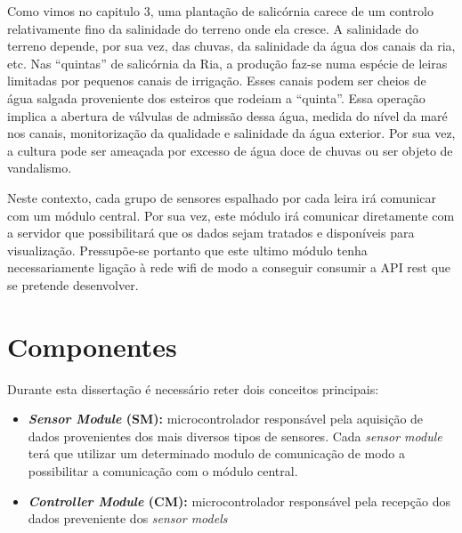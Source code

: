 Como vimos no capitulo 3, uma plantação de  salicórnia carece de um controlo relativamente fino da salinidade do terreno onde ela cresce. A salinidade do terreno depende, por sua vez, das chuvas, da salinidade da água dos canais da ria, etc. Nas “quintas” de salicórnia da Ria, a produção faz-se numa espécie de leiras limitadas por pequenos canais de irrigação. Esses canais podem ser cheios de água salgada proveniente dos esteiros que rodeiam a “quinta”. Essa operação implica a abertura de válvulas de admissão dessa água, medida do nível da maré nos canais, monitorização da qualidade e salinidade da água exterior.
Por sua vez, a cultura pode ser ameaçada por excesso de água doce de chuvas ou ser objeto de vandalismo.





Neste contexto, cada grupo de sensores espalhado por cada leira irá comunicar com um módulo central. Por sua vez, este módulo irá comunicar diretamente com a servidor que possibilitará que os dados sejam tratados e disponíveis para visualização. Pressupõe-se portanto que este ultimo módulo tenha necessariamente ligação à rede wifi de modo a conseguir consumir a API rest que se pretende desenvolver. 


\section{Componentes}

Durante esta dissertação é necessário reter dois conceitos principais: 

\begin{itemize}
	\item \textbf{\textit{Sensor Module }(SM):} microcontrolador responsável pela aquisição de dados provenientes dos mais diversos tipos de sensores. Cada \textit{sensor module} terá que utilizar um determinado modulo de comunicação de modo a possibilitar a comunicação com o módulo central. 
	 
	\item \textbf{\textit{Controller Module }(CM):} microcontrolador responsável pela recepção dos dados preveniente dos \textit{sensor models} 
\end{itemize}







